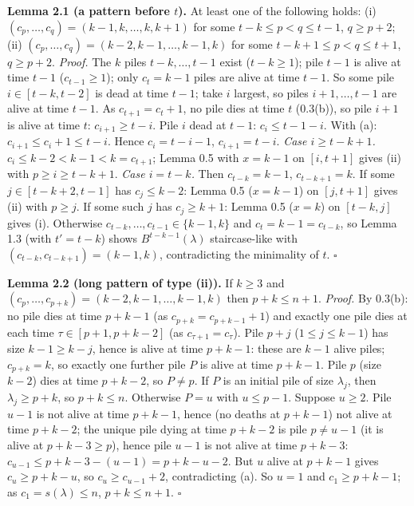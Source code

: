 \documentclass[11pt,a4paper]{article}
\begin{document}
\textbf{Lemma 2.1 (a pattern before \(t\)).} At least one of the
following holds: (i) \((c_p,\dots,c_q)=(k-1,k,\dots,k,k+1)\) for some
\(t-k\le p<q\le t-1\), \(q\ge p+2\); (ii)
\((c_p,\dots,c_q)=(k-2,k-1,\dots,k-1,k)\) for some
\(t-k+1\le p<q\le t+1\), \(q\ge p+2\). \emph{Proof.} The \(k\) piles
\(t-k,\dots,t-1\) exist (\(t-k\ge1\)); pile \(t-1\) is alive at time
\(t-1\) (\(c_{t-1}\ge1\)); only \(c_t=k-1\) piles are alive at time
\(t-1\). So some pile \(i\in[t-k,t-2]\) is dead at time \(t-1\); take
\(i\) largest, so piles \(i+1,\dots,t-1\) are alive at time \(t-1\). As
\(c_{t+1}=c_t+1\), no pile dies at time \(t\) (0.3(b)), so pile \(i+1\)
is alive at time \(t\): \(c_{i+1}\ge t-i\). Pile \(i\) dead at \(t-1\):
\(c_i\le t-1-i\). With (a): \(c_{i+1}\le c_i+1\le t-i\). Hence
\(c_i=t-i-1\), \(c_{i+1}=t-i\). \emph{Case \(i\ge t-k+1\).}
\(c_i\le k-2<k-1<k=c_{t+1}\); Lemma 0.5 with \(x=k-1\) on \([i,t+1]\)
gives (ii) with \(p\ge i\ge t-k+1\). \emph{Case \(i=t-k\).} Then
\(c_{t-k}=k-1\), \(c_{t-k+1}=k\). If some \(j\in[t-k+2,t-1]\) has
\(c_j\le k-2\): Lemma 0.5 (\(x=k-1\)) on \([j,t+1]\) gives (ii) with
\(p\ge j\). If some such \(j\) has \(c_j\ge k+1\): Lemma 0.5 (\(x=k\))
on \([t-k,j]\) gives (i). Otherwise
\(c_{t-k},\dots,c_{t-1}\in\{k-1,k\}\) and \(c_t=k-1=c_{t-k}\), so Lemma
1.3 (with \(t'=t-k\)) shows \(B^{t-k-1}(\lambda)\) staircase-like with
\((c_{t-k},c_{t-k+1})=(k-1,k)\), contradicting the minimality of \(t\).
\(\square\)

\textbf{Lemma 2.2 (long pattern of type (ii)).} If \(k\ge3\) and
\((c_p,\dots,c_{p+k})=(k-2,k-1,\dots,k-1,k)\) then \(p+k\le n+1\).
\emph{Proof.} By 0.3(b): no pile dies at time \(p+k-1\) (as
\(c_{p+k}=c_{p+k-1}+1\)) and exactly one pile dies at each time
\(\tau\in[p+1,p+k-2]\) (as \(c_{\tau+1}=c_\tau\)). Pile \(p+j\)
(\(1\le j\le k-1\)) has size \(k-1\ge k-j\), hence is alive at time
\(p+k-1\): these are \(k-1\) alive piles; \(c_{p+k}=k\), so exactly one
further pile \(P\) is alive at time \(p+k-1\). Pile \(p\) (size \(k-2\))
dies at time \(p+k-2\), so \(P\ne p\). If \(P\) is an initial pile of
size \(\lambda_j\), then \(\lambda_j\ge p+k\), so \(p+k\le n\).
Otherwise \(P=u\) with \(u\le p-1\). Suppose \(u\ge2\). Pile \(u-1\) is
not alive at time \(p+k-1\), hence (no deaths at \(p+k-1\)) not alive at
time \(p+k-2\); the unique pile dying at time \(p+k-2\) is pile
\(p\neq u-1\) (it is alive at \(p+k-3\ge p\)), hence pile \(u-1\) is not
alive at time \(p+k-3\): \(c_{u-1}\le p+k-3-(u-1)=p+k-u-2\). But \(u\)
alive at \(p+k-1\) gives \(c_u\ge p+k-u\), so \(c_u\ge c_{u-1}+2\),
contradicting (a). So \(u=1\) and \(c_1\ge p+k-1\); as
\(c_1=s(\lambda)\le n\), \(p+k\le n+1\). \(\square\)
\end{document}
